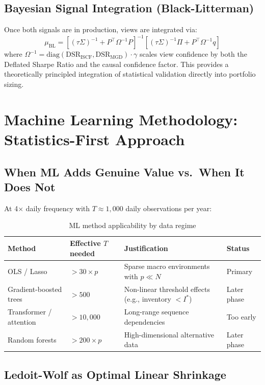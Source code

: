 \documentclass[11pt]{article}
\begin{document}
\subsection{Bayesian Signal Integration (Black-Litterman)}

Once both signals are in production, views are integrated via:
\begin{equation}
\mu_{\text{BL}} = \left[(\tau\Sigma)^{-1} + P^\top \Omega^{-1} P\right]^{-1} \left[(\tau\Sigma)^{-1}\Pi + P^\top \Omega^{-1} q\right]
\label{eq:black-litterman}
\end{equation}
where $\Omega^{-1} = \text{diag}(\text{DSR}_{\text{ISCF}}, \text{DSR}_{\text{MGD}}) \cdot \gamma$ scales view confidence by both the Deflated Sharpe Ratio and the causal confidence factor. This provides a theoretically principled integration of statistical validation directly into portfolio sizing.

\section{Machine Learning Methodology: Statistics-First Approach}

\subsection{When ML Adds Genuine Value vs.\ When It Does Not}

At 4$\times$ daily frequency with $T \approx 1{,}000$ daily observations per year:

\begin{table}[h]
\centering
\caption{ML method applicability by data regime}
\begin{tabular}{lp{2.7cm}p{5.5cm}l}
\toprule
Method & Effective $T$ needed & Justification & Status \\
\midrule
OLS / Lasso & $> 30 \times p$ & Sparse macro environments with $p \ll N$ & Primary \\
Gradient-boosted trees & $> 500$ & Non-linear threshold effects (e.g., inventory $< I^*$) & Later phase \\
Transformer / attention & $> 10{,}000$ & Long-range sequence dependencies & Too early \\
Random forests & $> 200 \times p$ & High-dimensional alternative data & Later phase \\
\bottomrule
\end{tabular}
\end{table}

\subsection{Ledoit-Wolf as Optimal Linear Shrinkage}
\end{document}
